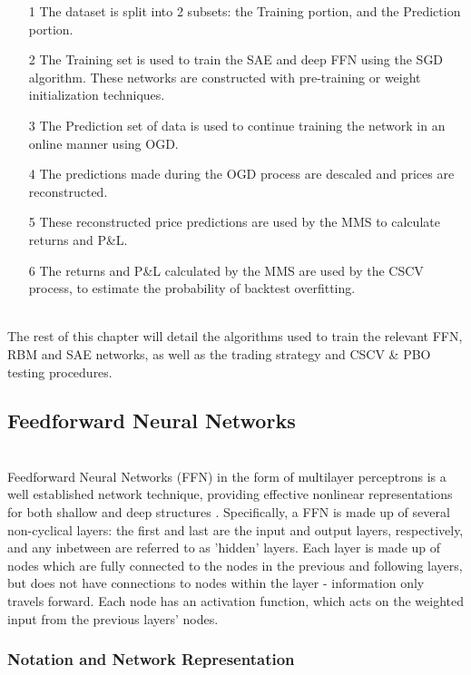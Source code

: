 \documentclass[a4paper,11pt,oneside]{article}
\theoremstyle{plain}
\theoremstyle{definition}
\begin{document}
\begin{itemize}
	\item [1] The dataset is split into 2 subsets: the Training portion, and the Prediction portion.
	\item [2] The Training set is used to train the SAE and deep FFN using the SGD algorithm. These networks are constructed with pre-training or weight initialization techniques.
	\item [3] The Prediction set of data is used to continue training the network in an online manner using OGD.
	\item [4] The predictions made during the OGD process are descaled and prices are reconstructed.
	\item [5] These reconstructed price predictions are used by the MMS to calculate returns and P\&L.
	\item [6] The returns and P\&L calculated by the MMS are used by the CSCV process, to estimate the probability of backtest overfitting.
\end{itemize}
~\\
The rest of this chapter will detail the algorithms used to train the relevant FFN, RBM and SAE networks, as well as the trading strategy and CSCV \& PBO testing procedures.

\subsection{Feedforward Neural Networks}\label{imp_ffn}
~\\
Feedforward Neural Networks (FFN) in the form of multilayer perceptrons is a well established network technique, providing effective nonlinear representations for both shallow and deep structures \cite{Schmidhuber}. Specifically, a FFN is made up of several non-cyclical layers: the first and last are the input and output layers, respectively, and any inbetween are referred to as 'hidden' layers. Each layer is made up of nodes which are fully connected to the nodes in the previous and following layers, but does not have connections to nodes within the layer - information only travels forward. Each 
node has an activation function, which acts on the weighted input from the previous layers' nodes.

\subsubsection{Notation and Network Representation}\label{imp_ffn_functions}
\end{document}
